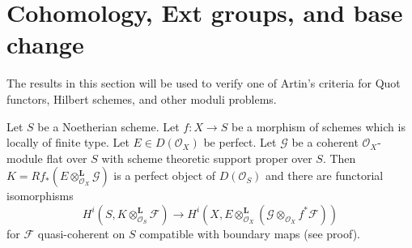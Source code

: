 \section{Cohomology, Ext groups, and base change}
\label{section-ext}

\noindent
The results in this section will be used to verify one of Artin's criteria
for Quot functors, Hilbert schemes, and other moduli problems.

\begin{lemma}
\label{lemma-compute-tensor-perfect}
Let $S$ be a Noetherian scheme. Let $f : X \to S$ be a morphism of schemes
which is locally of finite type. Let $E \in D(\mathcal{O}_X)$ be perfect.
Let $\mathcal{G}$ be a coherent $\mathcal{O}_X$-module flat over $S$
with scheme theoretic support proper over $S$. Then
$K = Rf_*(E \otimes_{\mathcal{O}_X}^\mathbf{L} \mathcal{G})$ is a perfect
object of $D(\mathcal{O}_S)$ and there are functorial isomorphisms
$$
H^i(S, K \otimes^\mathbf{L}_{\mathcal{O}_S} \mathcal{F})
\longrightarrow
H^i(X, E \otimes_{\mathcal{O}_X}^\mathbf{L}
(\mathcal{G} \otimes_{\mathcal{O}_X} f^*\mathcal{F}))
$$
for $\mathcal{F}$ quasi-coherent on $S$
compatible with boundary maps (see proof).
\end{lemma}

